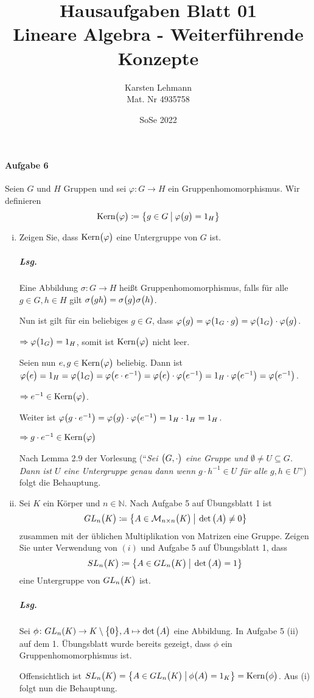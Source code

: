 \documentclass{scrreprt}
\author{Karsten Lehmann\\Mat. Nr 4935758}
\date{SoSe 2022}
\title{Hausaufgaben Blatt 01\\Lineare Algebra - Weiterführende Konzepte}
\newcommand{\Kern}{\text{Kern}}
\begin{document}
\paragraph{Aufgabe 6} Seien $G$ und $H$ Gruppen und sei $\varphi \colon G \to H$
ein Gruppenhomomorphismus.
Wir definieren
\[
  \Kern\qty\big(\varphi) \coloneqq
  \qty{ g \in G \:{\big |}\: \varphi\qty\big(g) = 1_H}
\]
\begin{enumerate}[(i)]
\item Zeigen Sie, dass $\Kern\qty\big(\varphi)$ eine Untergruppe von $G$ ist.

  \subparagraph{Lsg.} Eine Abbildung $\sigma \colon G \to H$ heißt
  Gruppenhomomorphismus, falls für alle $g \in G, h \in H$ gilt
  $\sigma\qty\big(gh) = \sigma\qty\big(g)\sigma\qty\big(h)$.

  Nun ist gilt für ein beliebiges $g \in G$, dass
  $\varphi\qty\big(g) = \varphi\qty\big(1_G \cdot g)
  = \varphi\qty\big(1_G) \cdot \varphi\qty\big(g)$.

  $\Rightarrow \varphi\qty\big(1_G) = 1_H$, somit ist $\Kern\qty\big(\varphi)$
  nicht leer.

  Seien nun $e, g \in \Kern\qty\big(\varphi)$ beliebig.
  Dann ist $\varphi\qty\big(e) = 1_H = \varphi\qty\big(1_G)
  = \varphi\qty\big(e \cdot e^{-1})
  = \varphi\qty\big(e) \cdot \varphi\qty\big(e^{-1})
  = 1_H \cdot \varphi\qty\big(e^{-1}) = \varphi\qty\big(e^{-1})$.

  $\Rightarrow e^{-1} \in \Kern\qty\big(\varphi)$.

  Weiter ist $\varphi\qty\big(g \cdot e^{-1})
  = \varphi\qty\big(g) \cdot \varphi\qty\big(e^{-1}) = 1_H \cdot 1_H = 1_H$.

  $\Rightarrow g \cdot e^{-1} \in \Kern\qty\big(\varphi)$

  Nach Lemma 2.9 der Vorlesung (``\emph{Sei $\qty\big(G, \cdot)$ eine Gruppe
    und $\emptyset \ne U \subseteq G$.
    Dann ist $U$ eine Untergruppe genau dann wenn $g \cdot h^{-1} \in U$
    für alle $g, h \in U$}'') folgt die Behauptung.

\item Sei $K$ ein Körper und $n \in \mathbb{N}$.
  Nach Aufgabe 5 auf Übungsblatt 1 ist
  \[
    GL_n\qty\big(K) \coloneqq \qty{
      A \in \mathcal{M}_{n \times n}\qty\big(K)
      \:{\big |}\:
      \det\qty\big(A) \ne 0
    }
  \]
  zusammen mit der üblichen Multiplikation von Matrizen eine Gruppe.
  Zeigen Sie unter Verwendung von $(i)$ und Aufgabe 5 auf Übungsblatt 1, dass
  \[
    SL_n\qty\big(K) \coloneqq \qty{
      A \in GL_n\qty\big(K)
      \:{\big |}\:
      \det\qty\big(A) = 1
    }
  \]
  eine Untergruppe von $GL_n\qty\big(K)$ ist.

  \subparagraph{Lsg.} Sei $\phi \colon  GL_n(K) \to K \setminus \qty\big{0},
  A \mapsto \det\qty\big(A)$ eine Abbildung.
  In Aufgabe 5 (ii) auf dem 1. Übungsblatt wurde bereits gezeigt, dass
  $\phi$ ein Gruppenhomomorphismus ist.

  Offensichtlich ist $SL_n\qty\big(K) = \qty{
      A \in GL_n\qty\big(K)
      \:{\big |}\:
      \phi\qty\big(A) = 1_K
    } = \Kern\qty\big(\phi)$.
    Aus (i) folgt nun die Behauptung.
\end{enumerate}
\end{document}
